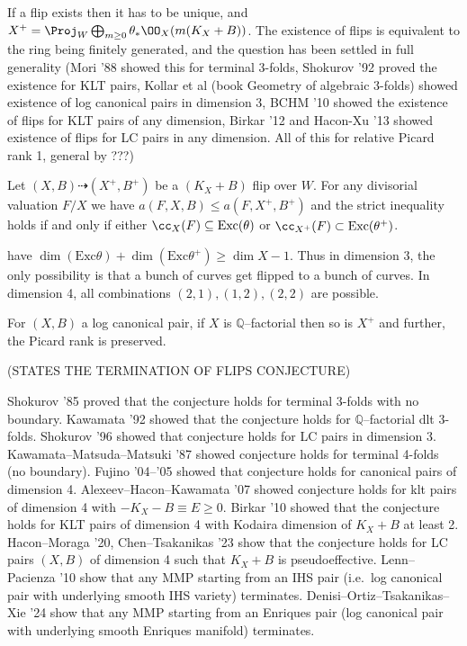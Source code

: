 If a flip exists then it has to be unique, and \(X^+=\Proj_W\bigoplus_{m\geq
0}\theta_\ast \OO_X(m(K_X+B))\). The existence of flips is equivalent to the
ring being finitely generated, and the question has been settled in full
generality (Mori '88 showed this for terminal 3-folds, Shokurov '92 proved the
existence for KLT pairs, Kollar et al (book Geometry of algebraic 3-folds)
showed existence of log canonical pairs in dimension 3, BCHM '10 showed the
existence of flips for KLT pairs of any dimension, Birkar '12 and Hacon-Xu '13
showed existence of flips for LC pairs in any dimension. All of this for
relative Picard rank 1, general by ???)

\begin{lemma}[(monotonicity)]
    Let \((X,B)\dashrightarrow (X^+,B^+)\) be a \((K_X+B)\) flip over \(W\). For
    any divisorial valuation \(F/X\) we have \(a(F,X,B)\leq a(F,X^+,B^+)\) and
    the strict inequality holds if and only if either \(\cc_X(F)\subseteq
    \text{Exc}(\theta)\) or \(\cc_{X^+}(F)\subset \text{Exc}(\theta^+)\).
\end{lemma}

\begin{lemma}
    have \(\dim(\text{Exc}\theta)+\dim(\text{Exc}\theta^+)\geq \dim X - 1\).
    Thus in dimension \(3\), the only possibility is that a bunch of curves get
    flipped to a bunch of curves. In dimension 4, all combinations
    \((2,1),(1,2),(2,2)\) are possible.
\end{lemma}

\begin{lemma}
    For \((X,B)\) a log canonical pair, if \(X\) is \(\mathbb{Q}\)--factorial
    then so is \(X^+\) and further, the Picard rank is preserved.
\end{lemma}

(STATES THE TERMINATION OF FLIPS CONJECTURE)

Shokurov '85 proved that the conjecture holds for terminal 3-folds with no
boundary. Kawamata '92 showed that the conjecture holds for
\(\mathbb{Q}\)--factorial dlt 3-folds. Shokurov '96 showed that conjecture holds
for LC pairs in dimension 3. Kawamata--Matsuda--Matsuki '87 showed conjecture
holds for terminal 4-folds (no boundary). Fujino '04--'05 showed that conjecture
holds for canonical pairs of dimension 4. Alexeev--Hacon--Kawamata '07 showed
conjecture holds for klt pairs of dimension 4 with \(-K_X-B\equiv E\geq 0\).
Birkar '10 showed that the conjecture holds for KLT pairs of dimension 4 with
Kodaira dimension of \(K_X+B\) at least 2. Hacon--Moraga '20, Chen--Tsakanikas
'23 show that the conjecture holds for LC pairs \((X,B)\) of dimension 4 such
that \(K_X+B\) is pseudoeffective. Lenn--Pacienza '10 show that any MMP starting
from an IHS pair (i.e.\ log canonical pair with underlying smooth IHS variety)
terminates. Denisi--Ortiz--Tsakanikas--Xie '24 show that any MMP starting from
an Enriques pair (log canonical pair with underlying smooth Enriques manifold) terminates.


